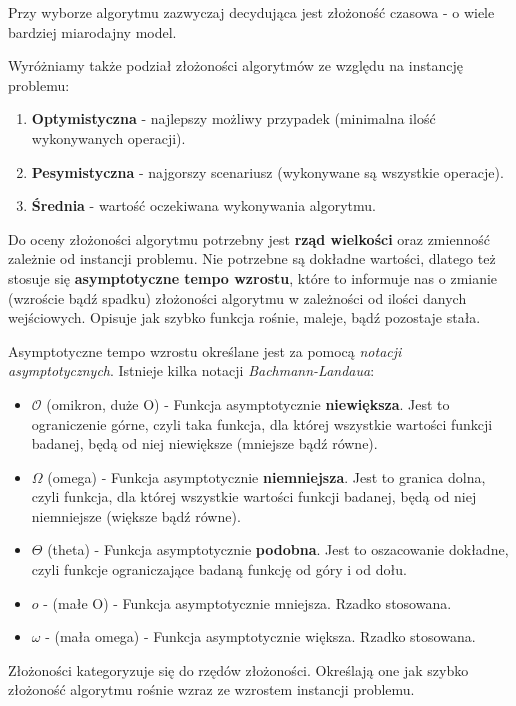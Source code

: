 Przy wyborze algorytmu zazwyczaj decydująca jest złożoność czasowa - o wiele bardziej miarodajny model.

Wyróżniamy także podział złożoności algorytmów ze względu na instancję problemu:
\begin{enumerate}
	\item \textbf{Optymistyczna} - najlepszy możliwy przypadek (minimalna ilość wykonywanych operacji).
	\item \textbf{Pesymistyczna} - najgorszy scenariusz (wykonywane są wszystkie operacje).
	\item \textbf{Średnia} - wartość oczekiwana wykonywania algorytmu.
\end{enumerate}

Do oceny złożoności algorytmu potrzebny jest \textbf{rząd wielkości} oraz zmienność zależnie od instancji problemu. Nie potrzebne są dokładne wartości, dlatego też stosuje się \textbf{asymptotyczne tempo wzrostu}, które to informuje nas o zmianie (wzroście bądź spadku) złożoności algorytmu w zależności od ilości danych wejściowych. Opisuje jak szybko funkcja rośnie, maleje, bądź pozostaje stała.

Asymptotyczne tempo wzrostu określane jest za pomocą \textit{notacji asymptotycznych}. Istnieje kilka notacji \textit{Bachmann-Landaua}:
\begin{itemize}
	\setlength\itemsep{1pt}
	\item $\mathcal{O}$ (omikron, duże O)  - Funkcja asymptotycznie \textbf{niewiększa}. Jest to ograniczenie górne, czyli taka funkcja, dla której wszystkie wartości funkcji badanej, będą od niej niewiększe (mniejsze bądź równe).
	\item $\Omega$ (omega) - Funkcja asymptotycznie \textbf{niemniejsza}. Jest to granica dolna, czyli funkcja, dla której wszystkie wartości funkcji badanej, będą od niej niemniejsze (większe bądź równe).
	\item $\Theta$ (theta) - Funkcja asymptotycznie \textbf{podobna}. Jest to oszacowanie dokładne, czyli funkcje ograniczające badaną funkcję od góry i od dołu.
	\item $o$ - (małe O) - Funkcja asymptotycznie mniejsza. Rzadko stosowana.
	\item $\omega$ - (mała omega) - Funkcja asymptotycznie większa. Rzadko stosowana.
\end{itemize}

Złożoności kategoryzuje się do rzędów złożoności. Określają one jak szybko złożoność algorytmu rośnie wzraz ze wzrostem instancji problemu.

